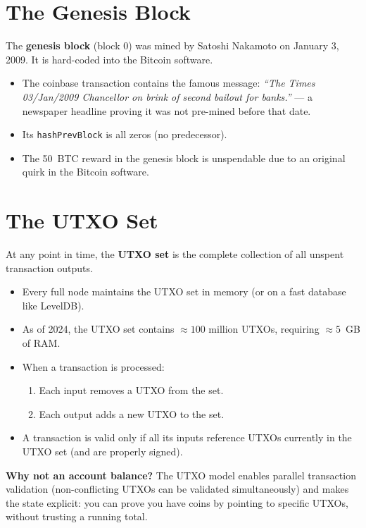 \documentclass[12pt,a4paper,openany]{book}
\theoremstyle{definition}
\theoremstyle{plain}
\theoremstyle{remark}
\begin{document}
\section{The Genesis Block}

The \textbf{genesis block} (block 0) was mined by Satoshi Nakamoto on
January 3, 2009.  It is hard-coded into the Bitcoin software.

\begin{itemize}
  \item The coinbase transaction contains the famous message:
        \emph{``The Times 03/Jan/2009 Chancellor on brink of second
        bailout for banks.''} — a newspaper headline proving it was not
        pre-mined before that date.
  \item Its \texttt{hashPrevBlock} is all zeros (no predecessor).
  \item The 50~BTC reward in the genesis block is unspendable due to an
        original quirk in the Bitcoin software.
\end{itemize}

\section{The UTXO Set}

At any point in time, the \textbf{UTXO set} is the complete collection
of all unspent transaction outputs.

\begin{itemize}
  \item Every full node maintains the UTXO set in memory (or on a fast
        database like LevelDB).
  \item As of 2024, the UTXO set contains $\approx 100$ million UTXOs,
        requiring $\approx 5$~GB of RAM.
  \item When a transaction is processed:
        \begin{enumerate}
          \item Each input removes a UTXO from the set.
          \item Each output adds a new UTXO to the set.
        \end{enumerate}
  \item A transaction is valid only if all its inputs reference UTXOs
        currently in the UTXO set (and are properly signed).
\end{itemize}

\begin{exambox}
  \textbf{Why not an account balance?}  The UTXO model enables parallel
  transaction validation (non-conflicting UTXOs can be validated
  simultaneously) and makes the state explicit: you can prove you have
  coins by pointing to specific UTXOs, without trusting a running total.
\end{exambox}
\end{document}
